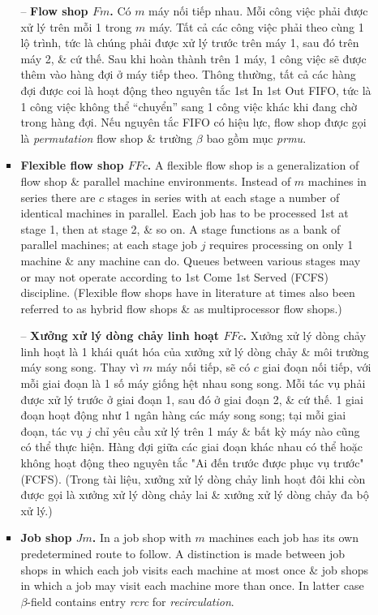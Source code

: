 \documentclass{article}
\begin{document}
\begin{itemize}
\begin{itemize}
\begin{itemize}
            -- {\bf Flow shop $Fm$.} Có $m$ máy nối tiếp nhau. Mỗi công việc phải được xử lý trên mỗi 1 trong $m$ máy. Tất cả các công việc phải theo cùng 1 lộ trình, tức là chúng phải được xử lý trước trên máy 1, sau đó trên máy 2, \& cứ thế. Sau khi hoàn thành trên 1 máy, 1 công việc sẽ được thêm vào hàng đợi ở máy tiếp theo. Thông thường, tất cả các hàng đợi được coi là hoạt động theo nguyên tắc 1st In 1st Out FIFO, tức là 1 công việc không thể ``chuyển'' sang 1 công việc khác khi đang chờ trong hàng đợi. Nếu nguyên tắc FIFO có hiệu lực, flow shop được gọi là {\it permutation} flow shop \& trường $\beta$ bao gồm mục {\it prmu}.
            \item {\bf Flexible flow shop $FFc$.} A flexible flow shop is a generalization of flow shop \& parallel machine environments. Instead of $m$ machines in series there are $c$ stages in series with at each stage a number of identical machines in parallel. Each job has to be processed 1st at stage 1, then at stage 2, \& so on. A stage functions as a bank of parallel machines; at each stage job $j$ requires processing on only 1 machine \& any machine can do. Queues between various stages may or may not operate according to 1st Come 1st Served (FCFS) discipline. (Flexible flow shops have in literature at times also been referred to as hybrid flow shops \& as multiprocessor flow shops.)

            -- {\bf Xưởng xử lý dòng chảy linh hoạt $FFc$.} Xưởng xử lý dòng chảy linh hoạt là 1 khái quát hóa của xưởng xử lý dòng chảy \& môi trường máy song song. Thay vì $m$ máy nối tiếp, sẽ có $c$ giai đoạn nối tiếp, với mỗi giai đoạn là 1 số máy giống hệt nhau song song. Mỗi tác vụ phải được xử lý trước ở giai đoạn 1, sau đó ở giai đoạn 2, \& cứ thế. 1 giai đoạn hoạt động như 1 ngân hàng các máy song song; tại mỗi giai đoạn, tác vụ $j$ chỉ yêu cầu xử lý trên 1 máy \& bất kỳ máy nào cũng có thể thực hiện. Hàng đợi giữa các giai đoạn khác nhau có thể hoặc không hoạt động theo nguyên tắc "Ai đến trước được phục vụ trước" (FCFS). (Trong tài liệu, xưởng xử lý dòng chảy linh hoạt đôi khi còn được gọi là xưởng xử lý dòng chảy lai \& xưởng xử lý dòng chảy đa bộ xử lý.)
            \item {\bf Job shop $Jm$.} In a job shop with $m$ machines each job has its own predetermined route to follow. A distinction is made between job shops in which each job visits each machine at most once \& job shops in which a job may visit each machine more than once. In latter case $\beta$-field contains entry {\it rcrc} for {\it recirculation}.


\end{itemize}
\end{itemize}
\end{itemize}
\end{document}
